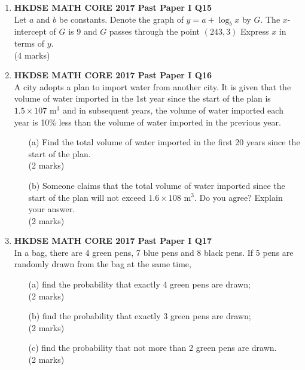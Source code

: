 \documentclass[12pt]{article}
\begin{document}
\begin{enumerate}
	\item \textbf{HKDSE MATH CORE 2017 Past Paper I Q15}\\
	Let $a$ and $b$ be constants. Denote the graph of $y = a + \log_b{x}$ by $G$. The $x$-intercept of $G$ is 9 and $G$ passes through the point $(243, 3)$ Express $x$ in terms of $y$. \\(4 marks)

	\item \textbf{HKDSE MATH CORE 2017 Past Paper I Q16}\\
	A city adopts a plan to import water from another city. It is given that the volume of water imported in the 1st year since the start of the plan is $1.5 \times 107$ m$^3$ and in subsequent years, the volume of water imported each year is 10\% less than the volume of water imported in the previous year.
	\begin{enumerate}
		\item[(a)] Find the total volume of water imported in the first 20 years since the start of the plan. \\(2 marks) 
		\item[(b)] Someone claims that the total volume of water imported since the start of the plan will not exceed $1.6 \times 108$ m$^3$. Do you agree? Explain your answer. \\(2 marks)
	\end{enumerate}

	\item \textbf{HKDSE MATH CORE 2017 Past Paper I Q17}\\
	In a bag, there are 4 green pens, 7 blue pens and 8 black pens. If 5 pens are randomly drawn from the bag at the same time,
	\begin{enumerate}
		\item[(a)] find the probability that exactly 4 green pens are drawn; \\(2 marks)
		\item[(b)] find the probability that exactly 3 green pens are drawn; \\(2 marks)
		\item[(c)] find the probability that not more than 2 green pens are drawn. \\(2 marks)
	\end{enumerate}


\end{enumerate}
\end{document}
